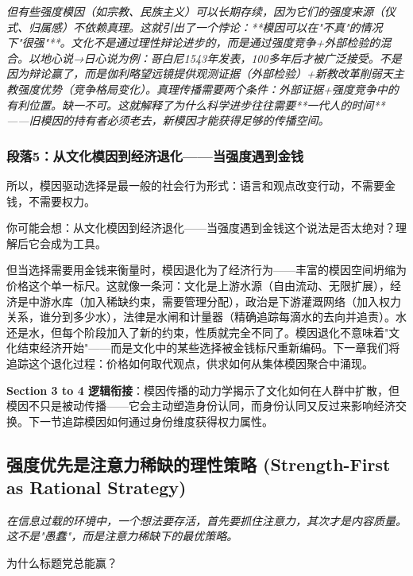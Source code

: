 \documentclass[a4paper,12pt]{book}
\newenvironment{motivation}{\begin{tcolorbox}[colback=gray!10,colframe=gray!60,title=\textit{本章动机},fonttitle=\bfseries,arc=0mm,leftrule=3mm]\small\itshape}{\end{tcolorbox}}
\newenvironment{questionbox}{\begin{tcolorbox}[colback=red!3!white,colframe=red!60!black]}{\end{tcolorbox}}
\begin{document}
\begin{motivation}
\begin{motivation}
\begin{motivation}
但有些强度模因（如宗教、民族主义）可以长期存续，因为它们的强度来源（仪式、归属感）不依赖真理。这就引出了一个悖论：**模因可以在"不真"的情况下"很强"**。文化不是通过理性辩论进步的，而是通过强度竞争+外部检验的混合。以地心说→日心说为例：哥白尼1543年发表，100多年后才被广泛接受。不是因为辩论赢了，而是伽利略望远镜提供观测证据（外部检验）+新教改革削弱天主教强度优势（竞争格局变化）。真理传播需要两个条件：外部证据+强度竞争中的有利位置。缺一不可。这就解释了为什么科学进步往往需要**一代人的时间**——旧模因的持有者必须老去，新模因才能获得足够的传播空间。

	\subsubsection*{段落5：从文化模因到经济退化——当强度遇到金钱}
	所以，模因驱动选择是最一般的社会行为形式：语言和观点改变行动，不需要金钱，不需要权力。
	\begin{tcolorbox}[colback=yellow!5, title=\textit{读者行为预测}]
		你可能会想：从文化模因到经济退化——当强度遇到金钱这个说法是否太绝对？理解后它会成为工具。
	\end{tcolorbox}

但当选择需要用金钱来衡量时，模因退化为了经济行为——丰富的模因空间坍缩为价格这个单一标尺。这就像一条河：文化是上游水源（自由流动、无限扩展），经济是中游水库（加入稀缺约束，需要管理分配），政治是下游灌溉网络（加入权力关系，谁分到多少水），法律是水闸和计量器（精确追踪每滴水的去向并追责）。水还是水，但每个阶段加入了新的约束，性质就完全不同了。模因退化不意味着"文化结束经济开始"——而是文化中的某些选择被金钱标尺重新编码。下一章我们将追踪这个退化过程：价格如何取代观点，供求如何从集体模因聚合中涌现。

	\textbf{Section 3 to 4 逻辑衔接}：模因传播的动力学揭示了文化如何在人群中扩散，但模因不只是被动传播——它会主动塑造身份认同，而身份认同又反过来影响经济交换。下一节追踪模因如何通过身份维度获得权力属性。


	
	\subsection{强度优先是注意力稀缺的理性策略 (Strength-First as Rational Strategy)}
	\begin{motivation}
		在信息过载的环境中，一个想法要存活，首先要抓住注意力，其次才是内容质量。这不是"愚蠢"，而是注意力稀缺下的最优策略。
	\end{motivation}
	\begin{questionbox}
		为什么标题党总能赢？
	\end{questionbox}


\end{motivation}
\end{motivation}
\end{motivation}
\end{document}
